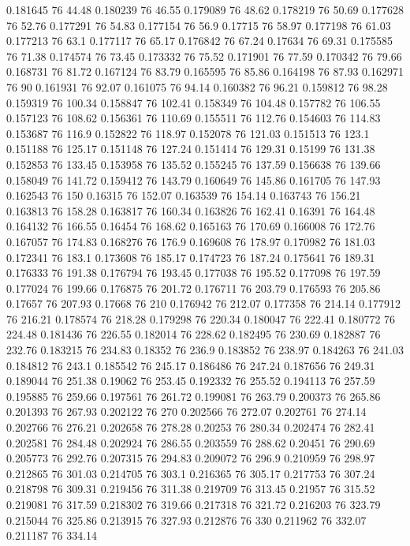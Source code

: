 0.181645 76 44.48
0.180239 76 46.55
0.179089 76 48.62
0.178219 76 50.69
0.177628 76 52.76
0.177291 76 54.83
0.177154 76 56.9
0.17715 76 58.97
0.177198 76 61.03
0.177213 76 63.1
0.177117 76 65.17
0.176842 76 67.24
0.17634 76 69.31
0.175585 76 71.38
0.174574 76 73.45
0.173332 76 75.52
0.171901 76 77.59
0.170342 76 79.66
0.168731 76 81.72
0.167124 76 83.79
0.165595 76 85.86
0.164198 76 87.93
0.162971 76 90
0.161931 76 92.07
0.161075 76 94.14
0.160382 76 96.21
0.159812 76 98.28
0.159319 76 100.34
0.158847 76 102.41
0.158349 76 104.48
0.157782 76 106.55
0.157123 76 108.62
0.156361 76 110.69
0.155511 76 112.76
0.154603 76 114.83
0.153687 76 116.9
0.152822 76 118.97
0.152078 76 121.03
0.151513 76 123.1
0.151188 76 125.17
0.151148 76 127.24
0.151414 76 129.31
0.15199 76 131.38
0.152853 76 133.45
0.153958 76 135.52
0.155245 76 137.59
0.156638 76 139.66
0.158049 76 141.72
0.159412 76 143.79
0.160649 76 145.86
0.161705 76 147.93
0.162543 76 150
0.16315 76 152.07
0.163539 76 154.14
0.163743 76 156.21
0.163813 76 158.28
0.163817 76 160.34
0.163826 76 162.41
0.16391 76 164.48
0.164132 76 166.55
0.16454 76 168.62
0.165163 76 170.69
0.166008 76 172.76
0.167057 76 174.83
0.168276 76 176.9
0.169608 76 178.97
0.170982 76 181.03
0.172341 76 183.1
0.173608 76 185.17
0.174723 76 187.24
0.175641 76 189.31
0.176333 76 191.38
0.176794 76 193.45
0.177038 76 195.52
0.177098 76 197.59
0.177024 76 199.66
0.176875 76 201.72
0.176711 76 203.79
0.176593 76 205.86
0.17657 76 207.93
0.17668 76 210
0.176942 76 212.07
0.177358 76 214.14
0.177912 76 216.21
0.178574 76 218.28
0.179298 76 220.34
0.180047 76 222.41
0.180772 76 224.48
0.181436 76 226.55
0.182014 76 228.62
0.182495 76 230.69
0.182887 76 232.76
0.183215 76 234.83
0.18352 76 236.9
0.183852 76 238.97
0.184263 76 241.03
0.184812 76 243.1
0.185542 76 245.17
0.186486 76 247.24
0.187656 76 249.31
0.189044 76 251.38
0.19062 76 253.45
0.192332 76 255.52
0.194113 76 257.59
0.195885 76 259.66
0.197561 76 261.72
0.199081 76 263.79
0.200373 76 265.86
0.201393 76 267.93
0.202122 76 270
0.202566 76 272.07
0.202761 76 274.14
0.202766 76 276.21
0.202658 76 278.28
0.20253 76 280.34
0.202474 76 282.41
0.202581 76 284.48
0.202924 76 286.55
0.203559 76 288.62
0.20451 76 290.69
0.205773 76 292.76
0.207315 76 294.83
0.209072 76 296.9
0.210959 76 298.97
0.212865 76 301.03
0.214705 76 303.1
0.216365 76 305.17
0.217753 76 307.24
0.218798 76 309.31
0.219456 76 311.38
0.219709 76 313.45
0.21957 76 315.52
0.219081 76 317.59
0.218302 76 319.66
0.217318 76 321.72
0.216203 76 323.79
0.215044 76 325.86
0.213915 76 327.93
0.212876 76 330
0.211962 76 332.07
0.211187 76 334.14
